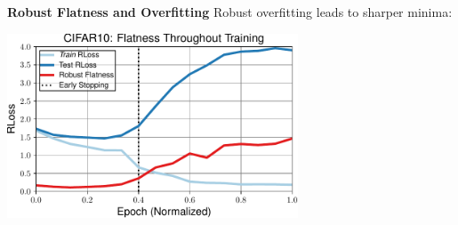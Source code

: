 \documentclass[64pt,aspectratio=169]{beamer}
\begin{document}
	\begin{frame}[t]{\bfseries Robust Flatness and Overfitting}
		\Large
		Robust overfitting leads to sharper minima:
		
		\centering
		\vspace*{8px}
		\includegraphics[height=5.5cm]{plots/talk_overview2.pdf}
	\end{frame}
	
\end{document}
